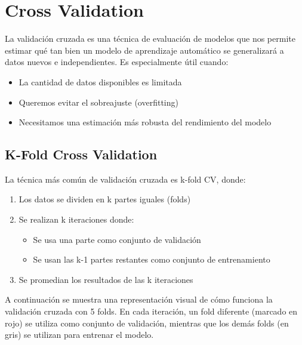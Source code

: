 \documentclass[12pt]{article}
\begin{document}
\section{Cross Validation}

La validación cruzada es una técnica de evaluación de modelos que nos permite estimar qué tan bien un modelo de aprendizaje automático se generalizará a datos nuevos e independientes. Es especialmente útil cuando:
\begin{itemize}
    \item La cantidad de datos disponibles es limitada
    \item Queremos evitar el sobreajuste (overfitting)
    \item Necesitamos una estimación más robusta del rendimiento del modelo
\end{itemize}

\subsection{K-Fold Cross Validation}
La técnica más común de validación cruzada es k-fold CV, donde:
\begin{enumerate}
    \item Los datos se dividen en k partes iguales (folds)
    \item Se realizan k iteraciones donde:
        \begin{itemize}
            \item Se usa una parte como conjunto de validación
            \item Se usan las k-1 partes restantes como conjunto de entrenamiento
        \end{itemize}
    \item Se promedian los resultados de las k iteraciones
\end{enumerate}

A continuación se muestra una representación visual de cómo funciona la validación cruzada con 5 folds. En cada iteración, un fold diferente (marcado en rojo) se utiliza como conjunto de validación, mientras que los demás folds (en gris) se utilizan para entrenar el modelo.
\end{document}
